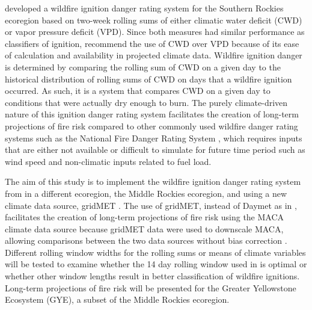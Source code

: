 \documentclass[11pt]{article}
\begin{document}
\citet{thomaWaterBalanceIndicator2020} developed a wildfire ignition danger rating system for the Southern Rockies ecoregion \citep{omernikEcoregionsConterminousUnited1987} based on two-week rolling sums of either climatic water deficit (CWD) or vapor pressure deficit (VPD). Since both measures had similar performance as classifiers of ignition, \citet{thomaWaterBalanceIndicator2020} recommend the use of CWD over VPD because of its ease of calculation and availability in projected climate data.  Wildfire ignition danger is determined by comparing the rolling sum of CWD on a given day to the historical distribution of rolling sums of CWD on days that a wildfire ignition occurred. As such, it is a system that compares CWD on a given day to conditions that were actually dry enough to burn. The purely climate-driven nature of this ignition danger rating system facilitates the creation of long-term projections of fire risk compared to other commonly used wildfire danger rating systems such as the National Fire Danger Rating System \citep{degrootChapter11Wildland2015}, which requires inputs that are either not available or difficult to simulate for future time period such as wind speed and non-climatic inputs related to fuel load.  

The aim of this study is to implement the wildfire ignition danger rating system from \citet{thomaWaterBalanceIndicator2020} in a different ecoregion, the Middle Rockies ecoregion, and using a new climate data source, gridMET \citep{abatzoglouDevelopmentGriddedSurface2013}.  The use of gridMET, instead of Daymet as in \citet{thomaWaterBalanceIndicator2020}, facilitates the creation of long-term projections of fire risk using the MACA climate data source \citep{abatzoglouComparisonStatisticalDownscaling2012} because gridMET data were used to downscale MACA, allowing comparisons between the two data sources without bias correction \citep{tercekRobustProjectionsConsequences2023}.  Different rolling window widths for the rolling sums or means of climate variables will be tested to examine whether the 14 day rolling window used in \citet{thomaWaterBalanceIndicator2020} is optimal or whether other window lengths result in better classification of wildfire ignitions.  Long-term projections of fire risk will be presented for the Greater Yellowstone Ecosystem (GYE), a subset of the Middle Rockies ecoregion.  

\end{document}
